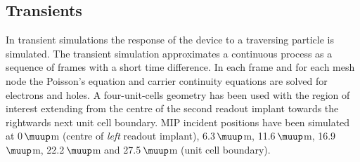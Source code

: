 \documentclass[a4paper,11pt]{article}
\begin{document}
\subsection{Transients}
\label{sec:tr}
In transient simulations the response of the device to a traversing particle is simulated. 
The transient simulation approximates a continuous process as a sequence of frames with a short time difference. 
In each frame and for each mesh node the Poisson's equation and carrier continuity equations are solved for electrons and holes.
A four-unit-cells geometry has been used with the region of interest extending from the centre of the second readout implant towards the rightwards next unit cell boundary.  
MIP incident positions have been simulated at 0\,$\muup$m (centre of \textit{left} readout implant), 6.3\,$\muup$m, 11.6\,$\muup$m, 16.9\,$\muup$m, 22.2\,$\muup$m and 27.5\,$\muup$m (unit cell boundary).
\end{document}
